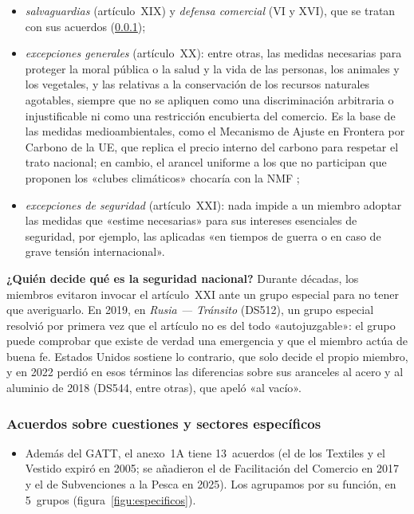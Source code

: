 \documentclass[11pt]{article}
\begin{document}
\begin{itemize}
\begin{itemize}
  \item \emph{salvaguardias} (artículo~XIX) y \emph{defensa comercial} (VI y XVI), que se tratan con sus acuerdos (\ref{sec:especificos});
  \item \emph{excepciones generales} (artículo~XX): entre otras, las medidas necesarias para proteger la moral pública o la salud y la vida de las personas, los animales y los vegetales, y las relativas a la conservación de los recursos naturales agotables, siempre que no se apliquen como una discriminación arbitraria o injustificable ni como una restricción encubierta del comercio. Es la base de las medidas medioambientales, como el Mecanismo de Ajuste en Frontera por Carbono de la UE, que replica el precio interno del carbono para respetar el trato nacional; en cambio, el arancel uniforme a los que no participan que proponen los «clubes climáticos» chocaría con la NMF ;
  \item \emph{excepciones de seguridad} (artículo~XXI): nada impide a un miembro adoptar las medidas que «estime necesarias» para sus intereses esenciales de seguridad, por ejemplo, las aplicadas «en tiempos de guerra o en caso de grave tensión internacional».
  \end{itemize}
\end{itemize}

\begin{anotaciones}
\textbf{¿Quién decide qué es la seguridad nacional?} Durante décadas, los miembros evitaron invocar el artículo~XXI ante un grupo especial para no tener que averiguarlo. En 2019, en \emph{Rusia — Tránsito} (DS512), un grupo especial resolvió por primera vez que el artículo no es del todo «autojuzgable»: el grupo puede comprobar que existe de verdad una emergencia y que el miembro actúa de buena fe. Estados Unidos sostiene lo contrario, que solo decide el propio miembro, y en 2022 perdió en esos términos las diferencias sobre sus aranceles al acero y al aluminio de 2018 (DS544, entre otras), que apeló «al vacío»\nocite{OMC2019DS512,OMC2022DS544}.
\end{anotaciones}

\subsubsection{Acuerdos sobre cuestiones y sectores específicos}\label{sec:especificos}

\begin{itemize}
\item Además del GATT, el anexo~1A tiene 13~acuerdos (el de los Textiles y el Vestido expiró en 2005; se añadieron el de Facilitación del Comercio en 2017 y el de Subvenciones a la Pesca en 2025)\nocite{OMC2026Panorama}. Los agrupamos por su función, en 5~grupos (figura~\ref{figu:especificos}).
\end{itemize}
\end{document}
